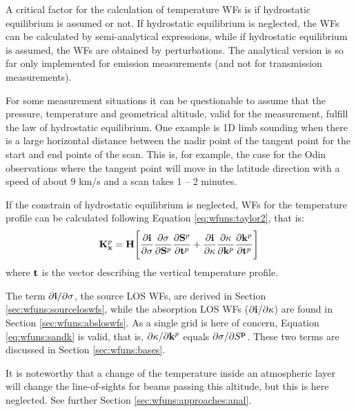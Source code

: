  \label{sec:wfuns:temp}
 
 A critical factor for the calculation of temperature WFs is if
 hydrostatic equilibrium is assumed or not. If hydrostatic equilibrium
 is neglected, the WFs can be calculated by semi-analytical
 expressions, while if hydrostatic equilibrium is assumed, the WFs are
 obtained by perturbations. The analytical version is so far only
 implemented for emission measurements (and not for transmission
 measurements).


 
 For some measurement situations it can be questionable to assume that
 the pressure, temperature and geometrical altitude, valid for the
 measurement, fulfill the law of hydrostatic equilibrium. One example
 is 1D limb sounding when there is a large horizontal distance between
 the nadir point of the tangent point for the start and end points of
 the scan. This is, for example, the case for the Odin observations
 where the tangent point will move in the latitude direction with a
 speed of about 9 km/s and a scan takes 1 -- 2 minutes.
 
 If the constrain of hydrostatic equilibrium is neglected, WFs for the
 temperature profile can be calculated following Equation
 \ref{eq:wfuns:taylor2}, that is:
 \begin{eqnarray}
    \mathbf{K}_{\mathbf{x}}^p = \mathbf{H} \Bigg[ \frac{\partial\mathbf{i}}{\partial \sigma}
                 \frac{\partial \sigma}{\partial \mathbf{S}^p} 
                 \frac{\partial \mathbf{S}^p}{\partial \mathbf{t}^p} +
                 \frac{\partial\mathbf{i}}{\partial \kappa}
                 \frac{\partial \kappa}{\partial \mathbf{k}^p}
                 \frac{\partial \mathbf{k}^p}{\partial \mathbf{t}^p} \Bigg]
 \end{eqnarray}  
 where $\mathbf{t}$ is the vector describing the vertical temperature profile. 
 
 The term $\partial \mathbf{i}/\partial \sigma$, the source LOS WFs, are
 derived in Section \ref{sec:wfuns:sourceloswfs}, while the absorption
 LOS WFs ($\partial \mathbf{i}/\partial \kappa$) are found in Section
 \ref{sec:wfuns:absloswfs}. As a single grid is here of concern,
 Equation \ref{eq:wfuns:sandk} is valid, that is, $\partial\kappa/
 \partial \mathbf{k}^p$ equals $\partial \sigma / \partial S^{\mathbf{p}}$.
 These two terms are discussed in Section \ref{sec:wfuns:bases}.
 
 It is noteworthy that a change of the temperature inside an
 atmospheric layer will change the line-of-sights for beams passing
 this altitude, but this is here neglected. See further Section
 \ref{sec:wfuns:approaches:anal}.

